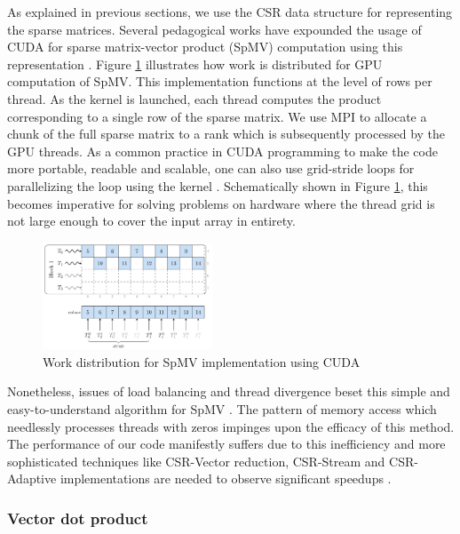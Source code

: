 \documentclass[sigplan,screen]{acmart}
\begin{document}
As explained in previous sections, we use the CSR data structure for representing the sparse matrices. Several pedagogical works have expounded the usage of CUDA for sparse matrix-vector product (SpMV) computation using this representation \cite{bell2008efficient, wang2010optimizing, spvm}. Figure \ref{spvm} illustrates how work is distributed for GPU computation of SpMV. This implementation functions at the level of rows per thread. As the kernel is launched, each thread computes the product corresponding to a single row of the sparse matrix. We use MPI to allocate a chunk of the full sparse matrix to a rank which is subsequently processed by the GPU threads. As a common practice in CUDA programming to make the code more portable, readable and scalable, one can also use grid-stride loops for parallelizing the loop using the kernel \cite{stride}. Schematically shown in Figure \ref{spvm}, this becomes imperative for solving problems on hardware where the thread grid is not large enough to cover the input array in entirety. 

\begin{figure}[h!]
	\begin{center}
		\includegraphics[width=0.45\textwidth]{spvm.png}
	\end{center}
	\caption{Work distribution for SpMV implementation using CUDA \cite{spvm}}
	\label{spvm} 
\end{figure}

Nonetheless, issues of load balancing and thread divergence beset this simple and easy-to-understand algorithm for SpMV \cite{spvm}. The pattern of memory access which needlessly processes threads with zeros impinges upon the efficacy of this method. The performance of our code manifestly suffers due to this inefficiency and more sophisticated techniques like CSR-Vector reduction, CSR-Stream and CSR-Adaptive implementations are needed to observe significant speedups \cite{spvm}. 

\subsubsection{Vector dot product}\label{cuda_dot}
\end{document}
